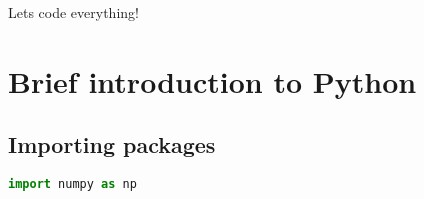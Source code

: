 Lets code everything!

\section{Brief introduction to Python}
\subsection{Importing packages}
\begin{lstlisting}[language=Python, style=mystyle2]
import numpy as np
\end{lstlisting}